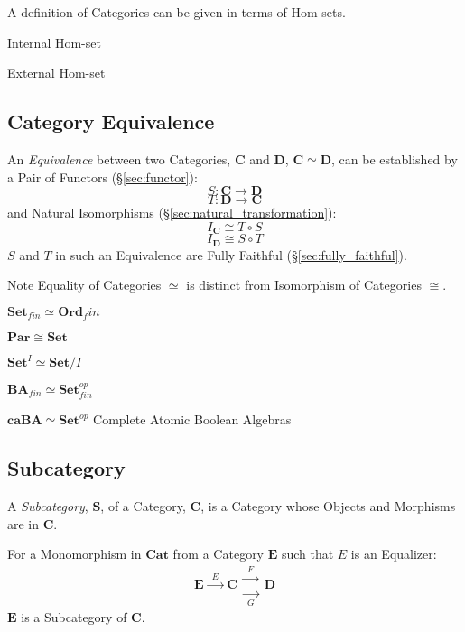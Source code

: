 A definition of Categories can be given in terms of Hom-sets. %

Internal Hom-set

External Hom-set



\subsection{Category Equivalence}\label{sec:category_equivalence}

An \emph{Equivalence} between two Categories, $\mathbf{C}$ and
$\mathbf{D}$, $\mathbf{C} \simeq \mathbf{D}$, can be established by a
Pair of Functors (\S\ref{sec:functor}):
\[
  S : \mathbf{C} \rightarrow \mathbf{D}
\]\[
  T : \mathbf{D} \rightarrow \mathbf{C}
\]
and Natural Isomorphisms (\S\ref{sec:natural_transformation}):
\[
  I_\mathbf{C} \cong T \circ S
\]\[
  I_\mathbf{D} \cong S \circ T
\]
$S$ and $T$ in such an Equivalence are Fully Faithful
(\S\ref{sec:fully_faithful}).

\HandRight\;Note Equality of Categories $\simeq$ is distinct from
Isomorphism of Categories $\cong$.

$\mathbf{Set}_{fin} \simeq \mathbf{Ord}_fin$

$\mathbf{Par} \cong \mathbf{Set}$

$\mathbf{Set}^I \simeq \mathbf{Set}/I$

$\mathbf{BA}_{fin} \simeq \mathbf{Set}_{fin}^{op}$

$\mathbf{caBA} \simeq \mathbf{Set}^{op}$ Complete Atomic Boolean
Algebras %



\subsection{Subcategory}\label{sec:subcategory}

A \emph{Subcategory}, $\mathbf{S}$, of a Category, $\mathbf{C}$, is a
Category whose Objects and Morphisms are in $\mathbf{C}$.

For a Monomorphism in $\mathbf{Cat}$ from a Category $\mathbf{E}$ such
that $E$ is an Equalizer:
\[
  \mathbf{E} \xrightarrow{\;\;E\;\;} \mathbf{C}
  \begin{matrix}
  \xrightarrow{\;\;F\;\;}\\
  \xrightarrow[\;\;G\;\;]{}
  \end{matrix}
  \mathbf{D}
\]
$\mathbf{E}$ is a Subcategory of $\mathbf{C}$.



